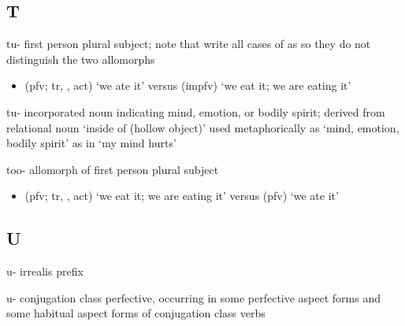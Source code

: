 \documentclass[12pt,letterpaper,oneside,article]{memoir}
\begin{document}
\subsection{T}\label{sec:alphalist-t}
\begin{morphdesc}[resume*=alphalist]
\item[tu-]
	first person plural subject;
	note that \cite{story-naish:1973} write all cases of  as 
		so they do not distinguish the two allomorphs
	\begin{itemize}
	\item	{} (pfv; tr, ,  act) ‘we ate it’\newline
		versus  (impfv) ‘we eat it; we are eating it’
	\end{itemize}

\item[tu-]
	incorporated noun indicating mind, emotion, or bodily spirit;
	derived from relational noun  ‘inside of (hollow object)’
	used metaphorically as ‘mind, emotion, bodily spirit’ as in  ‘my mind hurts’

\item[too-]
	allomorph of  first person plural subject
	\begin{itemize}
	\item	{} (pfv; tr, ,  act) ‘we eat it; we are eating it’\newline
		versus  (pfv) ‘we ate it’
	\end{itemize}
\end{morphdesc}

\subsection{U}\label{sec:alphalist-u}
\begin{morphdesc}[resume*=alphalist]
\item[u-]
	irrealis prefix

\item[u-]
	 conjugation class perfective,
	occurring in some perfective aspect forms and some habitual aspect forms of
	 conjugation class verbs
\end{morphdesc}
\end{document}
